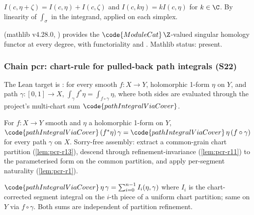 \begin{lemma}
\label{lem:pn-r17}
$I(c,\eta+\zeta)=I(c,\eta)+I(c,\zeta)$ and $I(c,k\eta)=kI(c,\eta)$ for
$k\in\C$.  By linearity of $\int_{\sigma}$ in the integrand, applied
on each simplex.
\leanok
\end{lemma}

\begin{lemma}
\label{lem:pn-r18}
 (mathlib v4.28.0,
) provides the
$\code{ModuleCat}\,\Z$-valued singular homology functor at every
degree, with functoriality  and
. Mathlib status: present.
\leanok\mathlibok
\end{lemma}

\subsubsection*{Chain pcr: chart-rule for pulled-back path integrals (S22)}

The Lean target is :
for every smooth $f:X\to Y$, holomorphic 1-form $\eta$ on $Y$, and path
$\gamma:[0,1]\to X$,
$\int_{\gamma}f^{*}\eta = \int_{f\circ\gamma}\eta$, where both
sides are evaluated through the project's multi-chart sum
$\code{pathIntegralViaCover}$.

\begin{lemma}
\label{lem:pcr-r0}
For $f:X\to Y$ smooth and $\eta$ a holomorphic 1-form on $Y$,
$\code{pathIntegralViaCover}\,(f^{*}\eta)\,\gamma=
\code{pathIntegralViaCover}\,\eta\,(f\circ\gamma)$ for every path
$\gamma$ on $X$.  Sorry-free assembly: extract a common-grain chart
partition (\ref{lem:pcr-r13}), descend through refinement-invariance
(\ref{lem:pcr-r11}) to the parameterised  form on the
common partition, and apply per-segment naturality
(\ref{lem:pcr-r1}).
\leanok
\end{lemma}

\begin{lemma}
\label{lem:pcr-r1}
$\code{pathIntegralViaCover}\,\eta\,\gamma = \sum_{i=0}^{n-1}I_{i}(\eta,\gamma)$
where $I_{i}$ is the chart-corrected segment integral on the
$i$-th piece of a uniform chart partition; same on $Y$ via
$f\circ\gamma$. Both sums are independent of partition refinement.
\leanok
\end{lemma}

